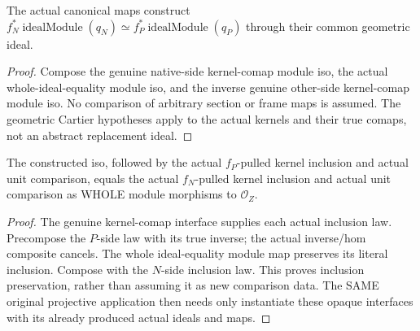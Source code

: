 \begin{definition}
\label{def:seven-two-cartier-kernel-comaps-comparison-route}
\leanok
{}
The actual canonical maps construct
$f_N^*\operatorname{idealModule}(q_N)\simeq
 f_P^*\operatorname{idealModule}(q_P)$ through their common geometric ideal.
\end{definition}
\begin{proof}
Compose the genuine native-side kernel-comap module iso, the actual
whole-ideal-equality module iso, and the inverse genuine other-side
kernel-comap module iso. No comparison of arbitrary section or frame maps
is assumed. The geometric Cartier hypotheses apply to the actual kernels
and their true comaps, not an abstract replacement ideal.
\end{proof}

\begin{theorem}
\label{thm:seven-two-cartier-kernel-comaps-comparison-inclusion-route}
\leanok
{}
The constructed iso, followed by the actual $f_P$-pulled kernel inclusion
and actual unit comparison, equals the actual $f_N$-pulled kernel inclusion
and actual unit comparison as WHOLE module morphisms to $\mathcal O_Z$.
\end{theorem}
\begin{proof}
The genuine kernel-comap interface supplies each actual inclusion law.
Precompose the $P$-side law with its true inverse; the actual inverse/hom
composite cancels. The whole ideal-equality module map preserves its
literal inclusion. Compose with the $N$-side inclusion law. This proves
inclusion preservation, rather than assuming it as new comparison data.
The SAME original projective application then needs only instantiate
these opaque interfaces with its already produced actual ideals and maps.
\end{proof}

